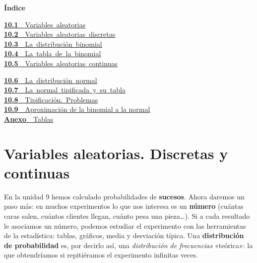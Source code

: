\documentclass[11pt,a4paper]{article}
\begin{document}
\begin{tcolorbox}[colback=fmsurface,colframe=fmsurface,arc=3mm,left=4mm,right=4mm,top=2mm,bottom=2mm]
\small\textbf{Índice}\par\smallskip
\begin{minipage}[t]{0.49\linewidth}\small \mbox{\hyperlink{sec1}{\textbf{\color{fmgreen}10.1}\ \ Variables aleatorias}}\\[3pt]
\mbox{\hyperlink{sec2}{\textbf{\color{fmgreen}10.2}\ \ Variables aleatorias discretas}}\\[3pt]
\mbox{\hyperlink{sec3}{\textbf{\color{fmgreen}10.3}\ \ La distribución binomial}}\\[3pt]
\mbox{\hyperlink{sec4}{\textbf{\color{fmgreen}10.4}\ \ La tabla de la binomial}}\\[3pt]
\mbox{\hyperlink{sec5}{\textbf{\color{fmgreen}10.5}\ \ Variables aleatorias continuas}}\\[3pt]\end{minipage}\hfill\begin{minipage}[t]{0.49\linewidth}\small \mbox{\hyperlink{sec6}{\textbf{\color{fmgreen}10.6}\ \ La distribución normal}}\\[3pt]
\mbox{\hyperlink{sec7}{\textbf{\color{fmgreen}10.7}\ \ La normal tipificada y su tabla}}\\[3pt]
\mbox{\hyperlink{sec8}{\textbf{\color{fmgreen}10.8}\ \ Tipificación. Problemas}}\\[3pt]
\hyperlink{sec9}{\textbf{\color{fmgreen}10.9}\ \ Aproximación de la binomial a la normal}\\[3pt]\mbox{\hyperlink{annex}{\textbf{\color{fmgreen}Anexo}\ \ Tablas}}\end{minipage}
\end{tcolorbox}

\section{Variables aleatorias. Discretas y continuas}\hypertarget{sec1}{}

En la unidad 9 hemos calculado probabilidades de \textbf{sucesos}. Ahora daremos un paso más: en muchos experimentos lo que nos interesa es un \textbf{número} (cuántas caras salen, cuántos clientes llegan, cuánto pesa una pieza\dots{}). Si a cada resultado le asociamos un número, podemos estudiar el experimento con las herramientas de la estadística: tablas, gráficos, media y desviación típica. Una \textbf{distribución de probabilidad} es, por decirlo así, una \emph{distribución de frecuencias} «teórica»: la que obtendríamos si repitiéramos el experimento infinitas veces.
\end{document}

